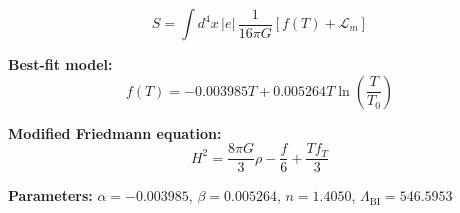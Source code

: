 
\begin{equation}
  S = \int d^4x \, |e| \, \frac{1}{16\pi G} \left[ f(T) + \mathcal{L}_m \right]
\end{equation}

\textbf{Best-fit model:}
\begin{equation}
  f(T) = -0.003985 T + 0.005264 T \ln\!\left(\frac{T}{T_0}\right)
\end{equation}

\textbf{Modified Friedmann equation:}
\begin{equation}
  H^2 = \frac{8\pi G}{3} \rho - \frac{f}{6} + \frac{T f_T}{3}
\end{equation}

\textbf{Parameters:}
$\alpha = -0.003985$, \quad
$\beta = 0.005264$, \quad
$n = 1.4050$, \quad
$\Lambda_{\text{BI}} = 546.5953$